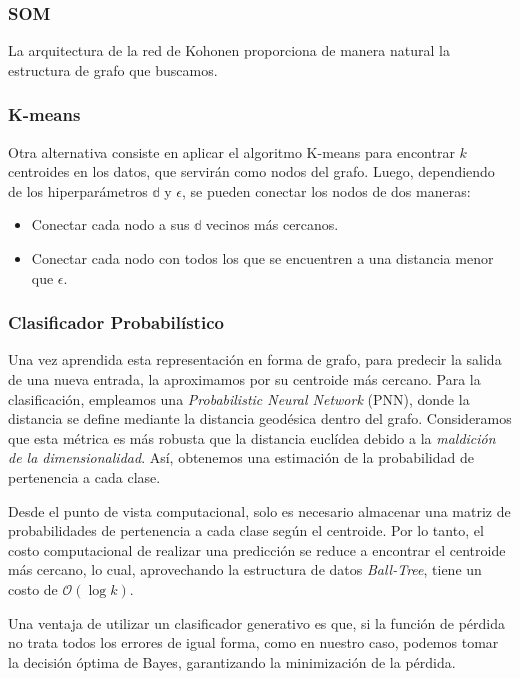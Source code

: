 \documentclass[titlepage,a4paper]{article}
\begin{document}
\subsubsection{SOM}
La arquitectura de la red de Kohonen proporciona de manera natural la estructura de grafo que buscamos.

\subsubsection{K-means}
Otra alternativa consiste en aplicar el algoritmo K-means para encontrar $k$ centroides en los datos, que servirán como nodos del grafo. Luego, dependiendo de los hiperparámetros $\mathbb{d}$ y $\mathbb{\epsilon}$, se pueden conectar los nodos de dos maneras:  
\begin{itemize}
    \item Conectar cada nodo a sus $\mathbb{d}$ vecinos más cercanos.
    \item Conectar cada nodo con todos los que se encuentren a una distancia menor que $\mathbb{\epsilon}$.
\end{itemize}

\subsubsection{Clasificador Probabilístico}
Una vez aprendida esta representación en forma de grafo, para predecir la salida de una nueva entrada, la aproximamos por su centroide más cercano. Para la clasificación, empleamos una \textit{Probabilistic Neural Network} (PNN), donde la distancia se define mediante la distancia geodésica dentro del grafo. Consideramos que esta métrica es más robusta que la distancia euclídea debido a la \textit{maldición de la dimensionalidad}. Así, obtenemos una estimación de la probabilidad de pertenencia a cada clase.

Desde el punto de vista computacional, solo es necesario almacenar una matriz de probabilidades de pertenencia a cada clase según el centroide. Por lo tanto, el costo computacional de realizar una predicción se reduce a encontrar el centroide más cercano, lo cual, aprovechando la estructura de datos \textit{Ball-Tree}, tiene un costo de $\mathcal{O}(\log k)$.

Una ventaja de utilizar un clasificador generativo es que, si la función de pérdida no trata todos los errores de igual forma, como en nuestro caso, podemos tomar la decisión óptima de Bayes, garantizando la minimización de la pérdida.
\end{document}
